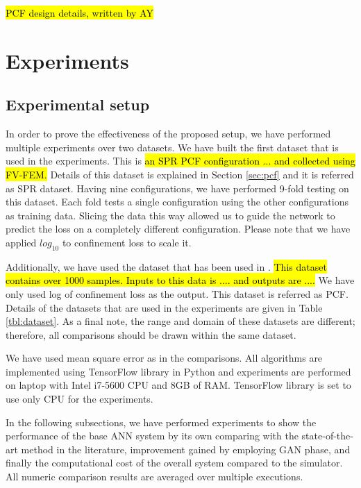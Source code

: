 \documentclass[draft, 10pt]{IEEEtran}
\begin{document}
\hl{PCF design details, written by AY}

\section{Experiments}
\label{sec:exp}

\subsection{Experimental setup}

\def\dszero{PCF}

In order to prove the effectiveness of the proposed setup, we have performed multiple experiments over two datasets. We have built the first dataset that is used in the experiments. This is \hl{an SPR PCF configuration ... and collected using FV-FEM.} Details of this dataset is explained in Section \ref{sec:pcf} and it is referred as SPR dataset. Having nine configurations, we have performed 9-fold testing on this dataset. Each fold tests a single configuration using the other configurations as training data. Slicing the data this way allowed us to guide the network to predict the loss on a completely different configuration. Please note that we have applied $log_{10}$ to confinement loss to scale it.

Additionally, we have used the dataset that has been used in \cite{paper0}. \hl{This dataset contains over 1000 samples. Inputs to this data is .... and outputs are ....} We have only used log of confinement loss as the output. This dataset is referred as \dszero. Details of the datasets that are used in the experiments are given in Table \ref{tbl:dataset}. As a final note, the range and domain of these datasets are different; therefore, all comparisons should be drawn within the same dataset.

We have used mean square error as in the comparisons. All algorithms are implemented using TensorFlow library in Python and experiments are performed on laptop with Intel i7-5600 CPU and 8GB of RAM. TensorFlow library is set to use only CPU for the experiments.

In the following subsections, we have performed experiments to show the performance of the base ANN system by its own comparing with the state-of-the-art method in the literature, improvement gained by employing GAN phase, and finally the computational cost of the overall system compared to the simulator. All numeric comparison results are averaged over multiple executions.
\end{document}
